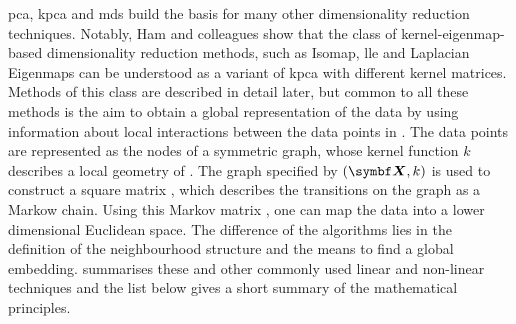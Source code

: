 \gls{pca}, \gls{kpca} and \gls{mds} build the basis for many other dimensionality reduction techniques. Notably, Ham and colleagues show that the class of kernel-eigenmap-based dimensionality reduction methods, such as Isomap, \gls{lle} and Laplacian Eigenmaps can be understood as a variant of \gls{kpca} with different kernel matrices. Methods of this class are described in detail later, but common to all these methods is the aim to obtain a global representation of the data  by using information about local interactions between the data points in . The data points are represented as the nodes of a symmetric graph, whose kernel function \(k\) describes a local geometry of . The graph specified by \((\mat{X}, k)\) is used to construct a square matrix , which describes the transitions on the graph as a Markow chain. Using this Markov matrix , one can map the data into a lower dimensional Euclidean space. The difference of the algorithms lies in the definition of the neighbourhood structure and the means to find a global embedding.  summarises these and other commonly used linear and non-linear techniques and the list below gives a short summary of the mathematical principles. 

